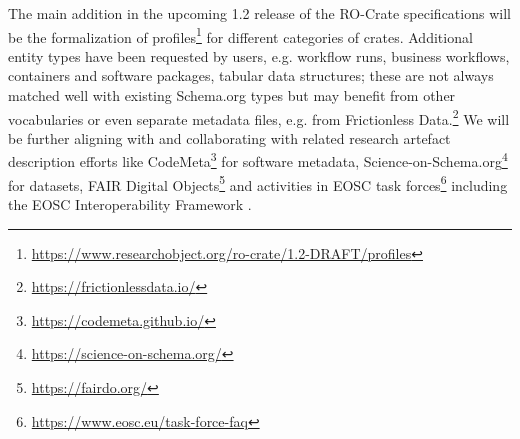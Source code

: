 \documentclass[ds,v1.1.2,openaccess]{iosart2x}%
\begin{document}
The main addition in the upcoming 1.2 release of the RO-Crate
specifications will be the formalization of
profiles\footnote{\url{https://www.researchobject.org/ro-crate/1.2-DRAFT/profiles}}
for different categories of crates. Additional entity types have been
requested by users, e.g. workflow runs, business workflows, containers
and software packages, tabular data structures; these are not always
matched well with existing Schema.org types but may benefit from other
vocabularies or even separate metadata files, e.g. from Frictionless
Data.\footnote{\url{https://frictionlessdata.io/}} We will be further aligning with
and collaborating with related research artefact description efforts
like CodeMeta\footnote{\url{https://codemeta.github.io/}} for software metadata,
Science-on-Schema.org\footnote{\url{https://science-on-schema.org/}}
\cite{doi:10.5281/zenodo.4477164} for datasets, FAIR Digital
Objects\footnote{\url{https://fairdo.org/}} \cite{doi:10.3390/publications8020021} and
activities in EOSC task forces\footnote{\url{https://www.eosc.eu/task-force-faq}}
including the EOSC Interoperability Framework \cite{doi:10.2777/620649}.





%

\end{document}
